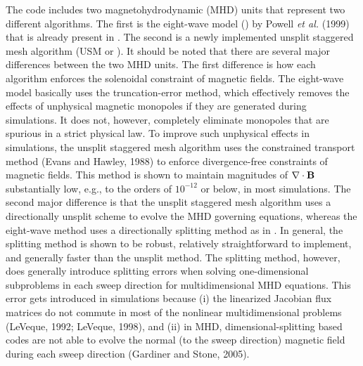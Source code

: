 The \flashx code includes two magnetohydrodynamic (MHD) units that represent
two different algorithms. The first is the eight-wave model () by Powell
{\it et al.} (1999) that is already present in \flashx. The second is
a newly implemented unsplit staggered mesh algorithm (USM or ).
It should be noted that there are several major differences between
the two MHD units. The first difference is how each algorithm
enforces the solenoidal constraint of magnetic fields. 
The eight-wave model basically uses the truncation-error method, which
effectively removes the effects of unphysical magnetic monopoles if
they are generated during simulations. It does not, however, completely
eliminate monopoles that are spurious in a strict physical law.
To improve such unphysical effects in simulations, the unsplit staggered mesh
algorithm uses the constrained transport method (Evans and Hawley, 1988) to
enforce divergence-free constraints of magnetic fields.
This method is shown to maintain magnitudes of
$\nabla\cdot\textbf{B}$ substantially low, e.g., to the orders of
$10^{-12}$ or below, in most simulations.
The second major difference is that the unsplit staggered mesh algorithm
uses a directionally unsplit scheme to evolve the MHD governing equations,
whereas the eight-wave method uses a directionally splitting method as in \flashx.
In general, the splitting method is shown to be robust, relatively
straightforward to implement, and generally faster than the unsplit
method.  The splitting method, however, does generally introduce splitting
errors when solving one-dimensional subproblems in each sweep direction
for multidimensional MHD equations.
This error gets introduced in simulations because 
(i) the linearized Jacobian flux matrices do not commute
in most of the nonlinear multidimensional problems
(LeVeque, 1992; LeVeque, 1998), and 
(ii) in MHD, dimensional-splitting based codes are not
able to evolve the normal (to the sweep direction) magnetic field
during each sweep direction (Gardiner and Stone, 2005).


